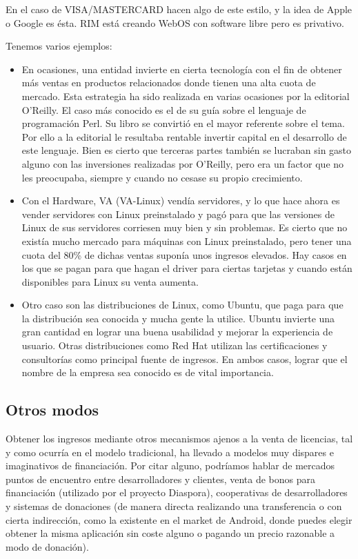 En el caso de VISA/MASTERCARD hacen algo de este estilo, y la idea de Apple o
Google es ésta. RIM está creando WebOS con software libre pero es privativo.

Tenemos varios ejemplos:
\begin{itemize}
  \item En ocasiones, una entidad invierte en cierta tecnología con el
    fin de obtener más ventas en productos relacionados donde tienen
    una alta cuota de mercado. Esta estrategia ha sido realizada en
    varias ocasiones por la editorial O'Reilly. El caso más conocido
    es el de su guía sobre el lenguaje de programación Perl. Su libro
    se convirtió en el mayor referente sobre el tema. Por ello
    a la editorial le resultaba rentable invertir capital en el
    desarrollo de este lenguaje. Bien es cierto que terceras partes
    también se lucraban sin gasto alguno con las inversiones
    realizadas por O'Reilly, pero era un factor que no les preocupaba,
    siempre y cuando no cesase su propio crecimiento.
  \item Con el Hardware, VA (VA-Linux) vendía servidores, y lo que hace ahora es vender
servidores con Linux preinstalado y pagó para que las versiones de Linux
de sus servidores corriesen muy bien y sin problemas. 
Es cierto que no existía mucho mercado para máquinas con Linux
preinstalado, pero tener una cuota del 80\% de dichas ventas suponía
unos ingresos elevados.
Hay casos en los que se
pagan para que hagan el driver para ciertas tarjetas y cuando están disponibles
para Linux su venta aumenta.
\item Otro caso son las distribuciones de Linux, como Ubuntu, que paga para
que la distribución sea conocida y mucha gente la utilice.
Ubuntu invierte una gran cantidad en lograr una buena usabilidad y
mejorar la experiencia de usuario. Otras distribuciones como Red Hat
utilizan las certificaciones y consultorías como principal fuente de
ingresos. En ambos casos, lograr que el nombre de la empresa sea
conocido es de vital importancia.
\end{itemize}

\subsection{Otros modos}
Obtener los ingresos mediante otros mecanismos ajenos a la venta de
licencias, tal y como ocurría en el modelo tradicional, ha llevado a
modelos muy dispares e imaginativos de financiación. Por citar alguno,
podríamos hablar de mercados puntos de encuentro entre desarrolladores
y clientes, venta de bonos para financiación (utilizado por el
proyecto Diaspora), cooperativas de desarrolladores y sistemas de
donaciones (de manera directa realizando una transferencia o con
cierta indirección, como la existente en el market de Android, donde
puedes elegir obtener la misma aplicación sin coste alguno o
pagando un precio razonable a modo de donación).

